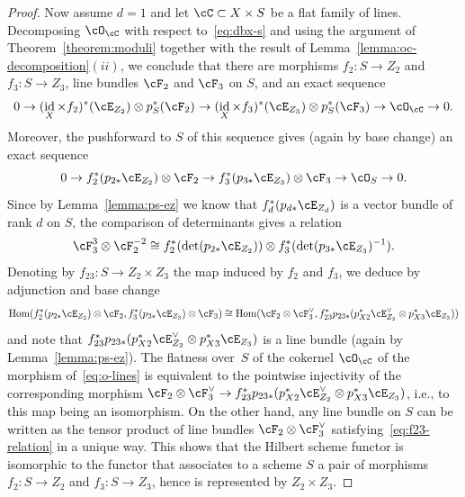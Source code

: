 \documentclass[11pt]{amsart}
\DeclareMathOperator{\Hom}{\mathrm{Hom}}
\DeclareMathOperator{\id}{\mathrm{id}}
\theoremstyle{plain}
\theoremstyle{definition}
\theoremstyle{remark}
\begin{document}
\begin{proof}
Now assume $d = 1$ and let $\cC \subset X \times S$ be a flat family of lines.
Decomposing $\cO_\cC$ with respect to~\eqref{eq:dbx-s} 
and using the argument of Theorem~\ref{theorem:moduli} together with the result of Lemma~\ref{lemma:oc-decomposition}$(ii)$,
we conclude that there are morphisms $f_2 \colon S \to Z_2$ and $f_3 \colon S \to Z_3$,
line bundles $\cF_2$ and $\cF_3$ on $S$, and an exact sequence
\begin{equation}\label{eq:o-lines}
0 \to (\id_X \times f_{2})^*(\cE_{Z_2}) \otimes p_S^*(\cF_2) \to (\id_X \times f_{3})^*(\cE_{Z_3}) \otimes p_S^*(\cF_3) \to \cO_\cC \to 0.
\end{equation}
Moreover, the pushforward to $S$ of this sequence gives (again by base change) an exact sequence
\begin{equation*}
0 \to f_{2}^*(p_{2*}\cE_{Z_2}) \otimes \cF_2 \to f_{3}^*(p_{3*}\cE_{Z_3}) \otimes \cF_3 \to \cO_S \to 0.
\end{equation*}
Since by Lemma~\ref{lemma:ps-ez} we know that $f_{d}^*(p_{d*}\cE_{Z_d})$ is a vector bundle of rank $d$ on $S$, the comparison of determinants gives  a relation
\begin{equation}\label{eq:f23-relation}
\cF_3^3 \otimes \cF_2^{-2} \cong f_{2}^*(\det(p_{2*}\cE_{Z_2})) \otimes f_{3}^*(\det(p_{3*}\cE_{Z_3})^{-1}).
\end{equation}
Denoting by $f_{23} \colon S \to Z_2 \times Z_3$ the map induced by $f_2$ and $f_3$, we deduce by adjunction and base change 
\begin{equation*}
\Hom(f_{2}^*(p_{2*}\cE_{Z_2}) \otimes \cF_2, f_{3}^*(p_{3*}\cE_{Z_3}) \otimes \cF_3) \cong
\Hom(\cF_2 \otimes \cF_3^\vee,f_{23}^*p_{23*}(p_{X2}^*\cE_{Z_2}^\vee \otimes p_{X3}^*\cE_{Z_3}))
\end{equation*}
and note that $f_{23}^*p_{23*}(p_{X2}^*\cE_{Z_2}^\vee \otimes p_{X3}^*\cE_{Z_3})$ is a line bundle (again by Lemma~\ref{lemma:ps-ez}).
The flatness over~$S$ of the cokernel $\cO_\cC$ of the morphism of~\eqref{eq:o-lines} is equivalent to the pointwise injectivity 
of the corresponding morphism $\cF_2 \otimes \cF_3^\vee \to f_{23}^*p_{23*}(p_{X2}^*\cE_{Z_2}^\vee \otimes p_{X3}^*\cE_{Z_3})$,
i.e., to this map being an isomorphism.
On the other hand, any line bundle on $S$ can be written as the tensor product of line bundles $\cF_2 \otimes \cF_3^\vee$ satisfying~\eqref{eq:f23-relation} in a unique way.
This shows that the Hilbert scheme functor is isomorphic to the functor that associates to a scheme $S$ a pair of morphisms $f_2 \colon S \to Z_2$ and $f_3 \colon S \to Z_3$,
hence is represented by $Z_2 \times Z_3$.
\end{proof}
\end{document}
